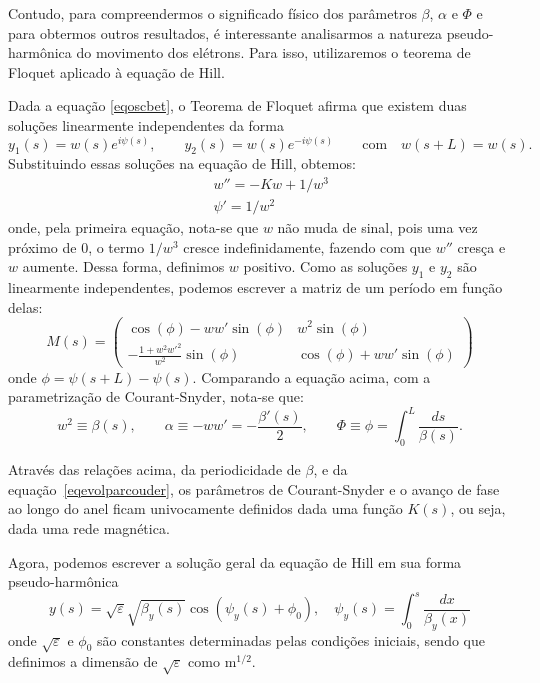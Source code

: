 Contudo, para compreendermos o significado físico dos parâmetros $\beta$, $\alpha$ e $\Phi$ e para obtermos outros resultados, é interessante analisarmos a natureza pseudo-harmônica do movimento dos elétrons. Para isso, utilizaremos o teorema de Floquet aplicado à equação de Hill.

Dada a equação \ref{eqoscbet}, o Teorema de Floquet afirma que existem duas soluções linearmente independentes da forma
\begin{equation}
 y_1(s)= w(s) e^{i \psi (s)}, \qquad y_2(s)= w(s) e^{-i \psi (s)}
\qquad \mathrm{com}\quad w(s+L)=w(s).
\end{equation}
Substituindo essas soluções na equação de Hill, obtemos:
\begin{align}
 & & w''= - K w + 1/w^3 \\
 & & \psi' = 1/w^2
\end{align}
onde, pela primeira equação, nota-se que $w$ não muda de sinal, pois uma vez próximo de $0$, o termo $1/w^3$ cresce indefinidamente, fazendo com que $w''$ cresça e $w$ aumente. Dessa forma, definimos $w$ positivo. Como as soluções $y_1$ e $y_2$ são linearmente independentes, podemos escrever a matriz
de um período em função delas:
\begin{equation}
 M(s)=\left(
\begin{array}{cc}
 \cos(\phi)-w w'\sin(\phi)    & w^2\sin(\phi) \\
 -\frac{1+w^2 w'^2}{w^2}\sin(\phi)  & \cos(\phi) + w w' \sin(\phi)
\end{array}\right)
\end{equation}
onde $\phi = \psi(s+L) - \psi(s)$. Comparando a equação acima, com a parametrização de Courant-Snyder, nota-se que:
\begin{equation}
 w^2 \equiv \beta(s) , \qquad \alpha \equiv -w w' = -\frac{\beta'(s)}{2},\qquad
\Phi \equiv \phi = \int_0^L \frac{d s}{\beta(s)}.
\end{equation}

Através das relações acima, da periodicidade de $\beta$, e da \mbox{equação \ref{eqevolparcouder}}, os parâmetros de Courant-Snyder e o avanço de fase ao longo do anel ficam univocamente definidos dada uma função $K(s)$, ou seja, dada uma rede magnética.

Agora, podemos escrever a solução geral da equação de Hill em sua forma pseudo-harmônica
\begin{equation}\label{eqpseudoharm}
 y(s)=\sqrt{\varepsilon} \sqrt{\beta_y(s)}\cos(\psi_y(s) + \phi_0),\quad
\psi_y(s)=\int_0^s \frac{d x}{\beta_y(x)}
\end{equation}
onde $\sqrt{\varepsilon}$ e $\phi_0$ são constantes determinadas pelas condições iniciais, sendo que definimos a dimensão de $\sqrt{\varepsilon}$ como m$^{1/2}$.


